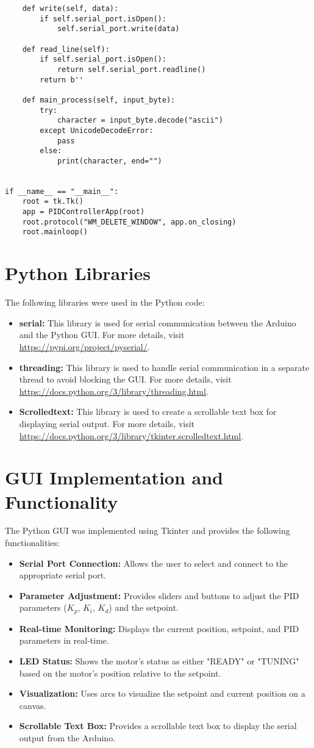 \documentclass{article}
\begin{document}
\begin{verbatim}
    def write(self, data):
        if self.serial_port.isOpen():
            self.serial_port.write(data)

    def read_line(self):
        if self.serial_port.isOpen():
            return self.serial_port.readline()
        return b''

    def main_process(self, input_byte):
        try:
            character = input_byte.decode("ascii")
        except UnicodeDecodeError:
            pass
        else:
            print(character, end="")


if __name__ == "__main__":
    root = tk.Tk()
    app = PIDControllerApp(root)
    root.protocol("WM_DELETE_WINDOW", app.on_closing)
    root.mainloop()
\end{verbatim}

\section{Python Libraries}
The following libraries were used in the Python code:
\begin{itemize}
    \item \textbf{serial:} This library is used for serial communication between the Arduino and the Python GUI. For more details, visit \url{https://pypi.org/project/pyserial/}.
    \item \textbf{threading:} This library is used to handle serial communication in a separate thread to avoid blocking the GUI. For more details, visit \url{https://docs.python.org/3/library/threading.html}.
    \item \textbf{Scrolledtext:} This library is used to create a scrollable text box for displaying serial output. For more details, visit \url{https://docs.python.org/3/library/tkinter.scrolledtext.html}.
\end{itemize}

\section{GUI Implementation and Functionality}
The Python GUI was implemented using Tkinter and provides the following functionalities:
\begin{itemize}
    \item \textbf{Serial Port Connection:} Allows the user to select and connect to the appropriate serial port.
    \item \textbf{Parameter Adjustment:} Provides sliders and buttons to adjust the PID parameters ($K_p$, $K_i$, $K_d$) and the setpoint.
    \item \textbf{Real-time Monitoring:} Displays the current position, setpoint, and PID parameters in real-time.
    \item \textbf{LED Status:} Shows the motor's status as either "READY" or "TUNING" based on the motor's position relative to the setpoint.
    \item \textbf{Visualization:} Uses arcs to visualize the setpoint and current position on a canvas.
    \item \textbf{Scrollable Text Box:} Provides a scrollable text box to display the serial output from the Arduino.
\end{itemize}
\end{document}
